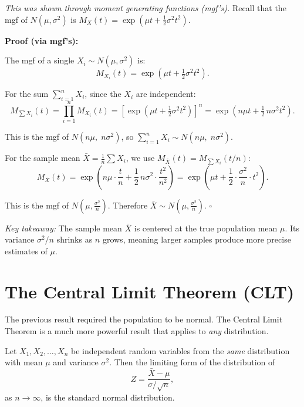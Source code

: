 \documentclass[10pt]{report}
\begin{document}
\textit{This was shown through moment generating functions (mgf's).} Recall that the mgf of $N(\mu, \sigma^2)$ is $M_X(t) = \exp\!\left(\mu t + \frac{1}{2}\sigma^2 t^2\right)$.

\medskip

\textbf{Proof (via mgf's):}

The mgf of a single $X_i \sim N(\mu, \sigma^2)$ is:
\[
M_{X_i}(t) = \exp\!\left(\mu t + \tfrac{1}{2}\sigma^2 t^2\right).
\]

For the sum $\sum_{i=1}^n X_i$, since the $X_i$ are independent:
\[
M_{\sum X_i}(t) = \prod_{i=1}^n M_{X_i}(t) = \left[\exp\!\left(\mu t + \tfrac{1}{2}\sigma^2 t^2\right)\right]^n = \exp\!\left(n\mu t + \tfrac{1}{2}\,n\sigma^2 t^2\right).
\]

This is the mgf of $N(n\mu,\; n\sigma^2)$, so $\sum_{i=1}^n X_i \sim N(n\mu,\; n\sigma^2)$.

For the sample mean $\bar{X} = \frac{1}{n}\sum X_i$, we use $M_{\bar{X}}(t) = M_{\sum X_i}(t/n)$:
\[
M_{\bar{X}}(t) = \exp\!\left(n\mu\cdot\frac{t}{n} + \frac{1}{2}\,n\sigma^2\cdot\frac{t^2}{n^2}\right) = \exp\!\left(\mu t + \frac{1}{2}\cdot\frac{\sigma^2}{n}\cdot t^2\right).
\]

This is the mgf of $N\!\left(\mu, \frac{\sigma^2}{n}\right)$. Therefore $\bar{X} \sim N\!\left(\mu, \frac{\sigma^2}{n}\right)$. \hfill $\square$

\medskip

\textit{Key takeaway:} The sample mean $\bar{X}$ is centered at the true population mean $\mu$. Its variance $\sigma^2/n$ shrinks as $n$ grows, meaning larger samples produce more precise estimates of $\mu$.

\section{The Central Limit Theorem (CLT)}

The previous result required the population to be normal. The Central Limit Theorem is a much more powerful result that applies to \emph{any} distribution.

\begin{tcolorbox}[colback=babyblue!15, colframe=babyblue!60!black, title=Central Limit Theorem]
Let $X_1, X_2, \ldots, X_n$ be independent random variables from the \emph{same} distribution with mean $\mu$ and variance $\sigma^2$. Then the limiting form of the distribution of
\[
Z = \frac{\bar{X} - \mu}{\sigma / \sqrt{n}},
\]
as $n \to \infty$, is the standard normal distribution.
\end{tcolorbox}
\end{document}
